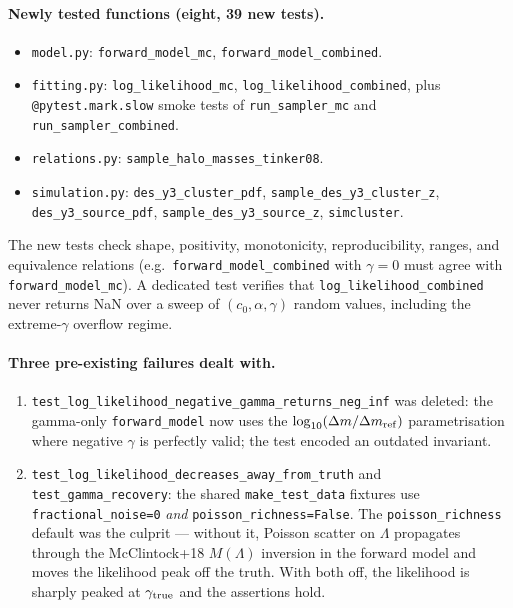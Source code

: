 \documentclass[11pt,a4paper]{article}
\newcommand{\dm}{\Delta m}
\begin{document}
\paragraph{Newly tested functions (eight, 39 new tests).}
\begin{itemize}[noitemsep]
  \item \texttt{model.py}: \texttt{forward\_model\_mc},
        \texttt{forward\_model\_combined}.
  \item \texttt{fitting.py}: \texttt{log\_likelihood\_mc},
        \texttt{log\_likelihood\_combined}, plus \texttt{@pytest.mark.slow}
        smoke tests of \texttt{run\_sampler\_mc} and
        \texttt{run\_sampler\_combined}.
  \item \texttt{relations.py}: \texttt{sample\_halo\_masses\_tinker08}.
  \item \texttt{simulation.py}: \texttt{des\_y3\_cluster\_pdf},
        \texttt{sample\_des\_y3\_cluster\_z}, \texttt{des\_y3\_source\_pdf},
        \texttt{sample\_des\_y3\_source\_z}, \texttt{simcluster}.
\end{itemize}
The new tests check shape, positivity, monotonicity, reproducibility,
ranges, and equivalence relations (e.g.\ \texttt{forward\_model\_combined}
with $\gamma{=}0$ must agree with \texttt{forward\_model\_mc}).  A
dedicated test verifies that \texttt{log\_likelihood\_combined} never
returns NaN over a sweep of $(c_0,\alpha,\gamma)$ random values, including
the extreme-$\gamma$ overflow regime.

\paragraph{Three pre-existing failures dealt with.}
\begin{enumerate}[noitemsep]
  \item \texttt{test\_log\_likelihood\_negative\_gamma\_returns\_neg\_inf}
        was deleted: the gamma-only \texttt{forward\_model} now uses the
        $\log_{10}(\dm/\dm_{\rm ref})$ parametrisation where negative
        $\gamma$ is perfectly valid; the test encoded an outdated
        invariant.
  \item \texttt{test\_log\_likelihood\_decreases\_away\_from\_truth} and
        \texttt{test\_gamma\_recovery}: the shared
        \texttt{make\_test\_data} fixtures use \texttt{fractional\_noise=0}
        \emph{and} \texttt{poisson\_richness=False}.  The
        \texttt{poisson\_richness} default was the culprit — without it,
        Poisson scatter on $\Lambda$ propagates through the McClintock+18
        $M(\Lambda)$ inversion in the forward model and moves the
        likelihood peak off the truth.  With both off, the likelihood is
        sharply peaked at $\gamma_{\rm true}$ and the assertions hold.
\end{enumerate}
\end{document}
